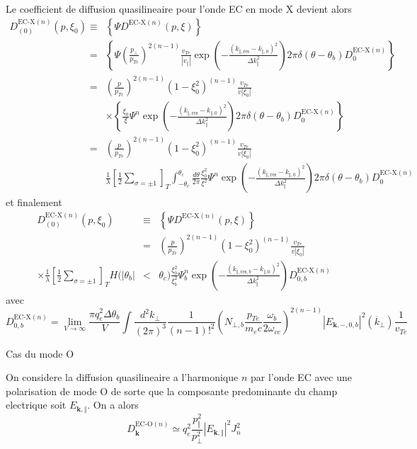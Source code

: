 Le coefficient de diffusion quasilineaire pour l'onde EC en mode X
devient alors \begin{eqnarray*}
D_{(0)}^{\text{EC-X}(n)}(p,\xi_{0}) & \equiv & \left\{ \Psi D^{\text{EC-X}(n)}(p,\xi)\right\} \\
 & = & \left\{ \Psi\left(\frac{p_{\bot}}{p_{Te}}\right)^{2(n-1)}\frac{v_{Te}}{\left|v_{\Vert}\right|}\exp\left(-\frac{\left(k_{\Vert,\text{res}}-k_{\Vert,0}\right)^{2}}{\Delta k_{\Vert}^{2}}\right)2\pi\delta(\theta-\theta_{b})D_{0}^{\text{EC-X}(n)}\right\} \\
 & = & \left(\frac{p}{p_{Te}}\right)^{2(n-1)}\left(1-\xi_{0}^{2}\right)^{(n-1)}\frac{v_{Te}}{v|\xi_{0}|}\\
 &  & \times\left\{ \frac{\xi_{0}}{\xi}\Psi^{n}\exp\left(-\frac{\left(k_{\Vert,\text{res}}-k_{\Vert,0}\right)^{2}}{\Delta k_{\Vert}^{2}}\right)2\pi\delta(\theta-\theta_{b})D_{0}^{\text{EC-X}(n)}\right\} \\
 & = & \left(\frac{p}{p_{Te}}\right)^{2(n-1)}\left(1-\xi_{0}^{2}\right)^{(n-1)}\frac{v_{Te}}{v|\xi_{0}|}\\
 &  & \frac{1}{\lambda}\left[\frac{1}{2}\sum_{\sigma=\pm1}\right]_{T}\int_{-\theta_{c}}^{\theta_{c}}\frac{d\theta}{2\pi}\frac{\xi_{0}^{2}}{\xi^{2}}\Psi^{n}\exp\left(-\frac{\left(k_{\Vert,\text{res}}-k_{\Vert,0}\right)^{2}}{\Delta k_{\Vert}^{2}}\right)2\pi\delta(\theta-\theta_{b})D_{0}^{\text{EC-X}(n)}\end{eqnarray*}
 et finalement \begin{eqnarray*}
D_{(0)}^{\text{EC-X}(n)}(p,\xi_{0}) & \equiv & \left\{ \Psi D^{\text{EC-X}(n)}(p,\xi)\right\} \\
 & = & \left(\frac{p}{p_{Te}}\right)^{2(n-1)}\left(1-\xi_{0}^{2}\right)^{(n-1)}\frac{v_{Te}}{v|\xi_{0}|}\\
\times\frac{1}{\lambda}\left[\frac{1}{2}\sum_{\sigma=\pm1}\right]_{T}H(|\theta_{b}| & < & \theta_{c})\frac{\xi_{0}^{2}}{\xi_{b}^{2}}\Psi_{b}^{n}\exp\left(-\frac{\left(k_{\Vert,\text{res},b}-k_{\Vert,0}\right)^{2}}{\Delta k_{\Vert}^{2}}\right)D_{0,b}^{\text{EC-X}(n)}\end{eqnarray*}
 avec \[
D_{0,b}^{\text{EC-X}(n)}=\lim_{V\rightarrow\infty}\frac{\pi q_{e}^{2}\Delta\theta_{b}}{V}\int\frac{d^{2}k_{\bot}}{(2\pi)^{3}}\frac{1}{(n-1)!^{2}}\left(N_{\bot,b}\frac{p_{Te}}{m_{e}c}\frac{\omega_{b}}{2\omega_{ce}}\right)^{2(n-1)}\left|E_{\mathbf{k},-,0,b}\right|^{2}(\overline{k}_{\bot})\frac{1}{v_{Te}}\]


Cas du mode O

On considere la diffusion quasilineaire a l'harmonique $n$ par l'onde
EC avec une polarisation de mode O de sorte que la composante predominante
du champ electrique soit $E_{\mathbf{k},\Vert}$. On a alors \[
D_{\mathbf{k}}^{\text{EC-O}(n)}\simeq q_{e}^{2}\frac{p_{\Vert}^{2}}{p_{\bot}^{2}}\left|E_{\mathbf{k},\Vert}\right|^{2}J_{n}^{2}\]


